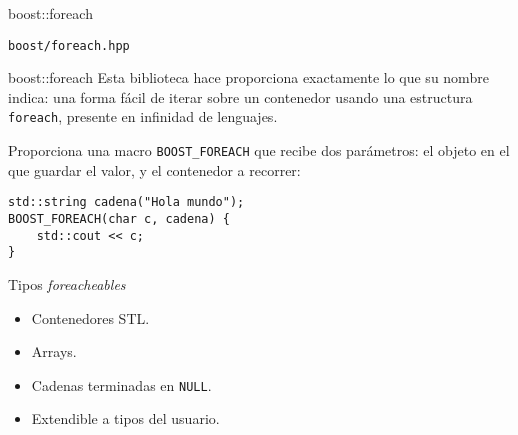 \documentclass[8pt,xcolor=svgnames]{beamer}
\begin{document}
\begin{frame}[fragile]{boost::foreach}
  \begin{block}{}
    \texttt{boost/foreach.hpp}
  \end{block}
  \begin{block}{boost::foreach}
    Esta biblioteca hace proporciona exactamente lo que su nombre
    indica: una forma fácil de iterar sobre un contenedor usando una
    estructura \texttt{foreach}, presente en infinidad de lenguajes.

    Proporciona una macro \texttt{BOOST\_FOREACH} que recibe dos
    parámetros: el objeto en el que guardar el valor, y el contenedor
    a recorrer:

\begin{verbatim}
std::string cadena("Hola mundo");
BOOST_FOREACH(char c, cadena) {
    std::cout << c;
}
\end{verbatim}
  \end{block}
\pause
  \begin{block}{Tipos \textit{foreacheables}}
    \begin{itemize}
    \item Contenedores STL.
    \item Arrays.
    \item Cadenas terminadas en \texttt{NULL}.
    \item Extendible a tipos del usuario.
    \end{itemize}
  \end{block}
\end{frame}
\end{document}
